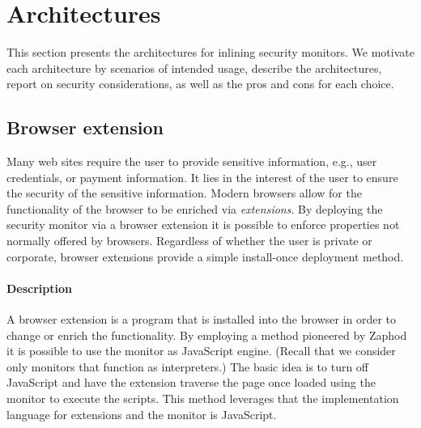 \documentclass{llncs}
\begin{document}


\vspace{-.4cm} 
\section{Architectures}
\label{sec:arch}
\vspace{-.2cm}
This section presents the architectures for inlining
security monitors. We motivate each architecture by scenarios of
intended usage, describe the architectures, report on
security considerations, as well as the pros and cons for each choice.



\vspace{-.4cm}
\subsection{Browser extension}\label{sec:arch:ext}
\vspace{-.2cm}
Many web sites require the user to provide sensitive information, e.g., user
credentials, or payment information. It lies in the interest of the user to
ensure the security of the sensitive information.  Modern browsers allow for
the functionality of the browser to be enriched via \emph{extensions}. By
deploying the security monitor via a browser extension it is possible to enforce
properties not normally offered by browsers.  Regardless of whether the user is
private or corporate, browser extensions provide a simple 
install-once deployment method.

\vspace{-.4cm}
\paragraph{Description}

A browser extension is a program that is installed into the browser in order to
change or enrich the functionality. By employing a method pioneered by
Zaphod~\cite{Zaphod} it is possible to use the monitor as JavaScript engine. 
(Recall that we consider only monitors that function as interpreters.)
The basic idea is to turn off JavaScript and have the extension traverse the
page once loaded using the monitor to execute the scripts. This method leverages 
that the implementation language for extensions and the monitor is JavaScript.
\end{document}
